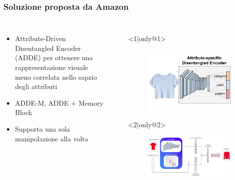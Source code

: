 \documentclass{beamer}
\begin{document}
\begin{frame}
\frametitle{Soluzione proposta da Amazon}
\begin{columns}
\begin{itemize} 
\item <1-> Attribute-Driven Disentangled Encoder (ADDE) per ottenere una rappresentazione visuale meno correlata nello sapzio degli attributi
\item <2-> ADDE-M, ADDE $+$ Memory Block
\item <3-> Supporta una sola manipolazione alla volta

\end{itemize}
\begin{itemize}
	\item[] <1|only@1> 
		\begin{figure}[!h]
 			\begin{center}
 			\includegraphics[scale=0.35]{"Immagini/ASDE.png"}
 			\end{center}
 		\end{figure}
 	\item[] <2|only@2> 
		\begin{figure}[!h]
 			\begin{center}
 			\includegraphics[scale=0.17]{"Immagini/ADDE-M_Simplified.png"}

\end{center}
\end{figure}
\end{itemize}
\end{columns}
\end{frame}
\end{document}
